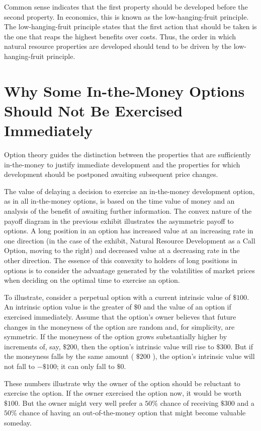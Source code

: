 \documentclass[11pt]{article}
\begin{document}
Common sense indicates that the first property should be developed before the second property. In economics, this is known as the low-hanging-fruit principle. The low-hanging-fruit principle states that the first action that should be taken is the one that reaps the highest benefits over costs. Thus, the order in which natural resource properties are developed should tend to be driven by the low-hanging-fruit principle.

\section*{Why Some In-the-Money Options Should Not Be Exercised Immediately}
Option theory guides the distinction between the properties that are sufficiently in-the-money to justify immediate development and the properties for which development should be postponed awaiting subsequent price changes.

The value of delaying a decision to exercise an in-the-money development option, as in all in-the-money options, is based on the time value of money and an analysis of the benefit of awaiting further information. The convex nature of the payoff diagram in the previous exhibit illustrates the asymmetric payoff to options. A long position in an option has increased value at an increasing rate in one direction (in the case of the exhibit, Natural Resource Development as a Call Option, moving to the right) and decreased value at a decreasing rate in the other direction. The essence of this convexity to holders of long positions in options is to consider the advantage generated by the volatilities of market prices when deciding on the optimal time to exercise an option.

To illustrate, consider a perpetual option with a current intrinsic value of $\$ 100$. An intrinsic option value is the greater of $\$ 0$ and the value of an option if exercised immediately. Assume that the option's owner believes that future changes in the moneyness of the option are random and, for simplicity, are symmetric. If the moneyness of the option grows substantially higher by increments of, say, $\$ 200$, then the option's intrinsic value will rise to $\$ 300$. But if the moneyness falls by the same amount ( $\$ 200$ ), the option's intrinsic value will not fall to $-\$ 100$; it can only fall to $\$ 0$.

These numbers illustrate why the owner of the option should be reluctant to exercise the option. If the owner exercised the option now, it would be worth $\$ 100$. But the owner might very well prefer a $50 \%$ chance of receiving $\$ 300$ and a $50 \%$ chance of having an out-of-the-money option that might become valuable someday.
\end{document}
